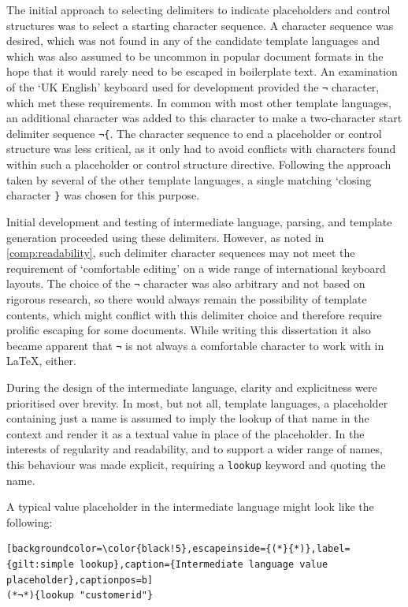 The initial approach to selecting delimiters to indicate placeholders and control structures was to select a starting character sequence. A character sequence was desired, which was not found in any of the candidate template languages and which was also assumed to be uncommon in popular document formats in the hope that it would rarely need to be escaped in boilerplate text. An examination of the `UK English' keyboard used for development provided the \verb!¬! character, which met these requirements. In common with most other template languages, an additional character was added to this character to make a two-character start delimiter sequence \verb!¬{!. The character sequence to end a placeholder or control structure was less critical, as it only had to avoid conflicts with characters found within such a placeholder or control structure directive. Following the approach taken by several of the other template languages, a single matching `closing character \verb!}! was chosen for this purpose.

Initial development and testing of intermediate language, parsing, and template generation proceeded using these delimiters. However, as noted in \autoref{comp:readability}, such delimiter character sequences may not meet the requirement of `comfortable editing' on a wide range of international keyboard layouts. The choice of the \verb!¬! character was also arbitrary and not based on rigorous research, so there would always remain the possibility of template contents, which might conflict with this delimiter choice and therefore require prolific escaping for some documents. While writing this dissertation it also became apparent that \verb!¬! is not always a comfortable character to work with in \LaTeX, either.

During the design of the intermediate language, clarity and explicitness were prioritised over brevity. In most, but not all, template languages, a placeholder containing just a name is assumed to imply the lookup of that name in the context and render it as a textual value in place of the placeholder. In the interests of regularity and readability, and to support a wider range of names, this behaviour was made explicit, requiring a \verb!lookup! keyword and quoting the name.

A typical value placeholder in the intermediate language might look like the following:

\begin{lstlisting}[backgroundcolor=\color{black!5},escapeinside={(*}{*)},label={gilt:simple lookup},caption={Intermediate language value placeholder},captionpos=b]
(*¬*){lookup "customerid"}
\end{lstlisting}

